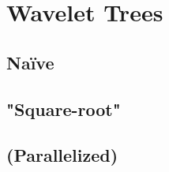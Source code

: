 \section{Wavelet Trees}

\subsection{Naïve}

\subsection{"Square-root"}

\subsection{(Parallelized)}